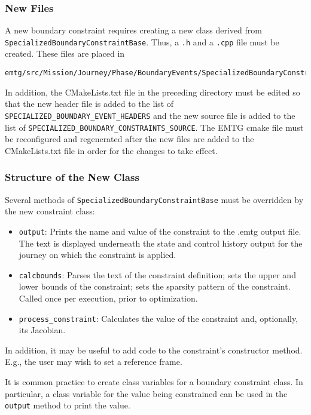 \documentclass[11pt]{article}
\begin{document}
\subsubsection{New Files}

A new boundary constraint requires creating a new class derived from \texttt{SpecializedBoundaryConstraintBase}. Thus, a \texttt{.h} and a \texttt{.cpp} file must be created. These files are placed in 

\begin{verbatim}
emtg/src/Mission/Journey/Phase/BoundaryEvents/SpecializedBoundaryConstraints/
\end{verbatim}

In addition, the CMakeLists.txt file in the preceding directory must be edited so that the new header file is added to the list of \texttt{SPECIALIZED\_BOUNDARY\_EVENT\_HEADERS} and the new source file is added to the list of \texttt{SPECIALIZED\_BOUNDARY\_CONSTRAINTS\_SOURCE}. The EMTG cmake file must be reconfigured and regenerated after the new files are added to the CMakeLists.txt file in order for the changes to take effect.


\subsubsection{Structure of the New Class}

Several methods of \texttt{SpecializedBoundaryConstraintBase} must be overridden by the new constraint class:

\begin{itemize}
	\item \texttt{output}: Prints the name and value of the constraint to the .emtg output file. The text is displayed underneath the state and control history output for the journey on which the constraint is applied. 
	\item \texttt{calcbounds}: Parses the text of the constraint definition; sets the upper and lower bounds of the constraint; sets the sparsity pattern of the constraint. Called once per execution, prior to optimization.
	\item \texttt{process\_constraint}: Calculates the value of the constraint and, optionally, its Jacobian.
\end{itemize}

In addition, it may be useful to add code to the constraint's constructor method. E.g., the user may wish to set a reference frame.

It is common practice to create class variables for a boundary constraint class. In particular, a class variable for the value being constrained can be used in the \texttt{output} method to print the value.
\end{document}
